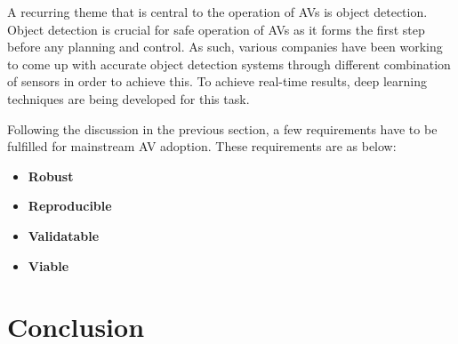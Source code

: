 A recurring theme that is central to the operation of AVs is object detection. Object detection is crucial for safe operation of AVs as it forms the first step before any planning and control. As such, various companies have been working to come up with accurate object detection systems through different combination of sensors in order to achieve this. To achieve real-time results, deep learning techniques are being developed for this task. 


Following the discussion in the previous section, a few requirements have to be fulfilled for mainstream AV adoption. 
These requirements are as below:
\begin{itemize}
    \item \textbf{Robust}
    \item \textbf{Reproducible}
    \item \textbf{Validatable}
    \item \textbf{Viable}
\end{itemize}











\section{Conclusion}




